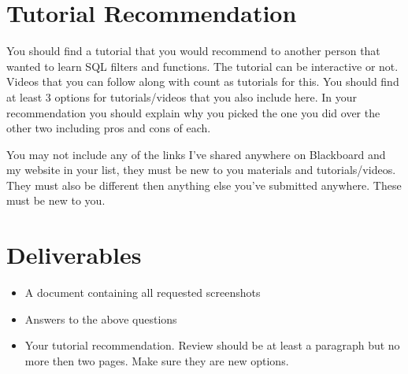 \documentclass[12pt]{article}
\begin{document}
    \section*{Tutorial Recommendation}
You should find a tutorial that you would recommend to another person that wanted to learn SQL filters and functions.  The tutorial can be interactive or not.  Videos that you can follow along with count as tutorials for this. You should find at least 3 options for tutorials/videos that you also include here. In your recommendation you should explain why you picked the one you did over the other two including pros and cons of each. 

You may not include any of the links I've shared anywhere on Blackboard and my website in your list, they must be new to you materials and tutorials/videos. They must also be different then anything else you've submitted anywhere.  These must be new to you.


\section*{Deliverables}
\begin{itemize}
    \item A document containing all requested screenshots
    \item Answers to the above questions
    \item Your tutorial recommendation.  Review should be at least a paragraph but no more then two pages. Make sure they are new options.
\end{itemize} 
\end{document}
